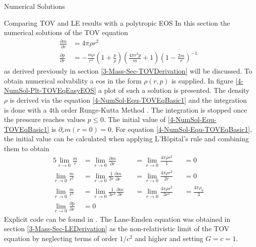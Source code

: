 \begin{section}{Numerical Solutions}
\begin{subsection}{Comparing TOV and LE results with a polytropic EOS}
\label{4-NumSol-Sec-Comp-TOV-LE}
In this section the numerical solutions of the \ac{TOV} equation
\begin{align}
	\frac{\partial m}{\partial r} &= 4\pi\rho r^2\label{4-NumSol-Equ-TOVEqBasic1}\\
	\frac{\partial p}{\partial r} &=-\frac{m\rho}{r^2}\left(1+\frac{p}{\rho}\right)\left(\frac{4\pi r^3 p}{m}+1\right)\left(1-\frac{2m}{r}\right)^{-1}
	\label{4-NumSol-Equ-TOVEqBasic2}
\end{align}
as derived previously in section \ref{3-Mass-Sec-TOVDerivation} will be discussed.
To obtain numerical solvability a \ac{eos} in the form $\rho(r,p)$ is supplied.
In figure \ref{4-NumSol-Plt-TOVEqEasyEOS} a plot of such a solution is presented.
The density $\rho$ is derived via the equation \eqref{4-NumSol-Equ-TOVEqBasic1} and the integration is done with a 4th order Runge-Kutta Method \cite{rungeUeberNumerischeAufloesung1895, schlömilch1901zeitschrift, h.SimplifiedDerivationAnalysis2010}.
The integration is stopped once the pressure reaches values $p\leq0$.
The initial value of \eqref{4-NumSol-Equ-TOVEqBasic1} is $\partial_r m(r=0)=0$.
For equation \eqref{4-NumSol-Equ-TOVEqBasic1}, the initial value can be calculated when applying L'Hôpital's rule and combining them to obtain
\begin{alignat}{5}
	\lim\limits_{r\rightarrow0}\frac{m}{r} &= \lim\limits_{r\rightarrow0}\frac{\partial m}{\partial r} &&=\lim\limits_{r\rightarrow0}\frac{4\pi\rho r^2}{1} &&= 0\\
	\lim\limits_{r\rightarrow0}\frac{m}{r^2} &= \lim\limits_{r\rightarrow0}\frac{1}{2r}\frac{\partial m}{\partial r}  &&= \lim\limits_{r\rightarrow0}\frac{4\pi\rho r^2}{2r} &&= 0\\
	\lim\limits_{r\rightarrow0}\frac{m}{r^3} &= \lim\limits_{r\rightarrow0}\frac{1}{3r^2}\frac{\partial m}{\partial r} &&=\lim\limits_{r\rightarrow0}\frac{4\pi\rho r^2}{3r^2} &&= \frac{4\pi\rho_0}{3}\\
	\lim\limits_{r\rightarrow0}\frac{\partial p}{\partial r} &= 0
\end{alignat}
Explicit code can be found in \cite{pleyerGithubRepositoryJonas2021}.
The Lane-Emden equation was obtained in section \ref{3-Mass-Sec-LEDerivation} as the non-relativistic limit of the \ac{TOV} equation by neglecting terms of order $1/c^2$ and higher and setting $G=c=1$.

\end{subsection}
\end{section}
